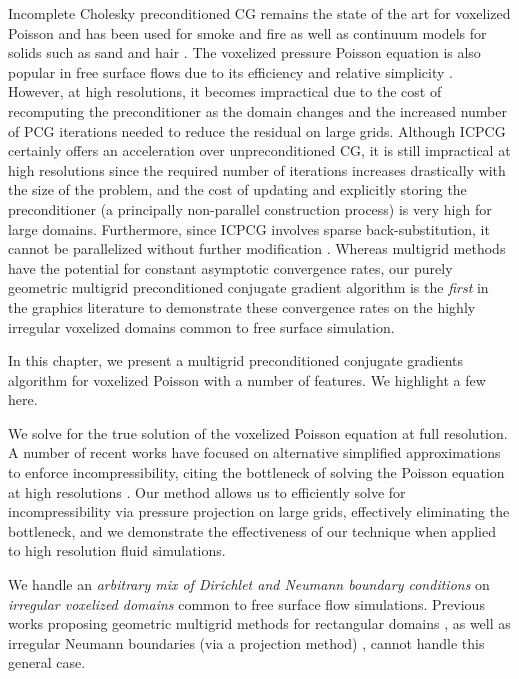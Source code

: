 Incomplete Cholesky preconditioned CG remains the state of the art for
voxelized Poisson and has been used for smoke \cite{SRF05,MTPS04,FSJ01} and fire \cite{HG09} as well as continuum models for solids such as sand \cite{zhu:2005:sand} and hair \cite{mcadams:2009:hair}. The voxelized pressure Poisson equation is also popular in free surface flows due to its efficiency and relative simplicity
\cite{CMT04,FF01,Goktekin:2004:viscoelastic,HK05,HLYK08,KC07,MTPS04,NNSM08,WMT05,zhu:2005:sand}.  However, at high resolutions, it becomes impractical due to the cost of recomputing the preconditioner as the domain changes and the increased number of PCG iterations needed to reduce the residual on large grids.  
Although ICPCG certainly offers an acceleration over unpreconditioned CG, it is still impractical at high resolutions since the required number of iterations increases drastically with the size of the problem, and the cost of updating and explicitly storing the preconditioner (a principally non-parallel construction process) 
is very high for large domains.  Furthermore, since ICPCG involves sparse back-substitution, it cannot be parallelized without further modification \cite{Hughes:2007:physicalsimulation}.
Whereas multigrid methods have the potential for constant asymptotic convergence rates, our purely geometric multigrid preconditioned conjugate gradient algorithm is the \emph{first} in the graphics literature to demonstrate these convergence rates on the highly irregular voxelized domains common to free surface simulation.

In this chapter, we present a multigrid preconditioned conjugate
gradients algorithm for voxelized Poisson with a number of features.
We highlight a few here.

We solve for the true solution of the voxelized Poisson equation at full resolution.  A number of recent works have focused on alternative simplified approximations to enforce incompressibility, citing the bottleneck of solving the Poisson equation at high resolutions \cite{HG09}.   Our method allows us to efficiently solve for incompressibility via pressure projection on large grids, effectively eliminating the bottleneck, and we demonstrate the effectiveness of our technique when applied to high resolution fluid simulations.  

We handle an \emph{arbitrary mix of Dirichlet and Neumann boundary conditions} on \emph{irregular voxelized domains} common to free surface flow simulations. Previous works proposing geometric multigrid methods for rectangular domains \cite{TO94,AF96,BWR05,BWK06,KH08}, as well as irregular Neumann boundaries (via a projection method) \cite{MCPN08}, cannot handle this general case.  

